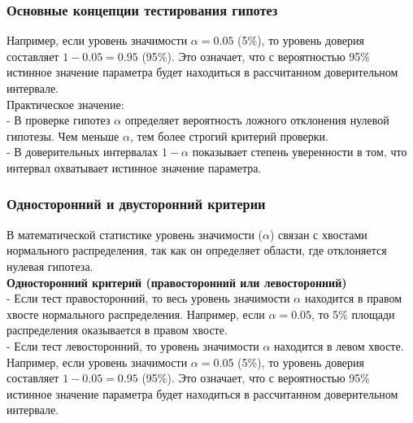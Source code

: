 \documentclass[aspectratio=169]{beamer}
\begin{document}
\begin{frame}
\frametitle{Основные концепции тестирования гипотез}
Например, если уровень значимости \(\alpha = 0.05\) (5\%), то уровень доверия составляет \(1 - 0.05 = 0.95\) (95\%). Это означает, что с вероятностью 95\% истинное значение параметра будет находиться в рассчитанном доверительном интервале.
\newline\\
Практическое значение:\\
- В проверке гипотез \(\alpha\) определяет вероятность ложного отклонения нулевой гипотезы. Чем меньше \(\alpha\), тем более строгий критерий проверки.\\
- В доверительных интервалах \(1 - \alpha\) показывает степень уверенности в том, что интервал охватывает истинное значение параметра.
\end{frame}

\begin{frame}
\frametitle{Односторонний и двусторонний критерии}
В математической статистике уровень значимости (\(\alpha\)) связан с хвостами нормального распределения, так как он определяет области, где отклоняется нулевая гипотеза.
\newline\\
{\bf Односторонний критерий (правосторонний или левосторонний)}\\
- Если тест правосторонний, то весь уровень значимости \(\alpha\) находится в правом хвосте нормального распределения. Например, если \(\alpha = 0.05\), то 5\% площади распределения оказывается в правом хвосте.\\
- Если тест левосторонний, то уровень значимости \(\alpha\) находится в левом хвосте.
Например, если уровень значимости \(\alpha = 0.05\) (5\%), то уровень доверия составляет \(1 - 0.05 = 0.95\) (95\%). Это означает, что с вероятностью 95\% истинное значение параметра будет находиться в рассчитанном доверительном интервале.
\end{frame}
\end{document}
